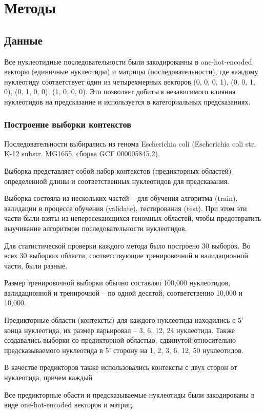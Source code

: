 \section{Методы}
\subsection{Данные}
Все нуклеотидные последовательности были закодированны в one-hot-encoded векторы (единичные нуклеотиды) и матрицы (последовательности), где каждому нуклеотиду соответствует один из четырехмерных векторов (0, 0, 0, 1), (0, 0, 1, 0), (0, 1, 0, 0), (1, 0, 0, 0). Это позволяет добиться независимого влияния нуклеотидов на предсказание и используется в категориальных предсказаниях.
\subsubsection{Построение выборки контекстов}

Последовательности выбирались из генома  Escherichia coli (Escherichia coli str. K-12 substr. MG1655, сборка GCF 000005845.2).

Выборка представляет собой набор контекстов (предикторных областей) определенной длины и соответственных нуклеотидов для предсказания.

Выборка состояла из нескольких частей --  для обучения алгоритма (train), валидации в процессе обучения (validate), тестирования (test). При этом эти части были взяты из непересекающихся геномных областей, чтобы предотвратить выучивание алгоритмом последовательности нуклеотидов.

Для статистической проверки каждого метода было построено 30 выборок. Во всех 30 выборках области, соответствующие тренировочной и валидационной части, были разные.

Размер тренировочной выборки обычно составлял 100,000 нуклеотидов, валидационной и тренирочной -- по одной десятой, соответственно 10,000 и 10,000.

Предикторные области (контексты) для каждого нуклеотида находились с 5' конца нуклеотида, их размер варьировал -- 3, 6, 12, 24 нуклеотида. Также создавались выборки со предикторной областью, сдвинутой относительно предсказываемого нуклеотида в 5' сторону на 1, 2, 3, 6, 12, 50 нуклеотидов.

В качестве предикторов также использовались контексты с двух сторон от нуклеотида, причем каждый

Все предикторные обасти и предсказываемые нуклеотиды были закодированы в виде one-hot-encoded векторов и матриц.

